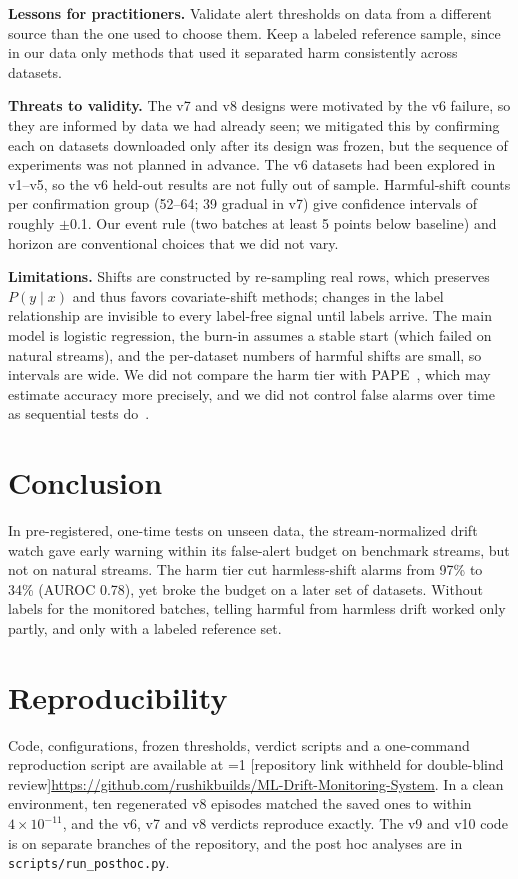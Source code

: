 \documentclass[conference]{IEEEtran}
\providecommand{\anonymous}{1}
\newcommand{\coderef}{\ifnum\anonymous=1 [repository link withheld for double-blind review]\else \url{https://github.com/rushikbuilds/ML-Drift-Monitoring-System}\fi}
\begin{document}
\textbf{Lessons for practitioners.} Validate alert thresholds on data from a different source than the one used to choose them. Keep a labeled reference sample, since in our data only methods that used it separated harm consistently across datasets.

\textbf{Threats to validity.} The v7 and v8 designs were motivated by the v6 failure, so they are informed by data we had already seen; we mitigated this by confirming each on datasets downloaded only after its design was frozen, but the sequence of experiments was not planned in advance. The v6 datasets had been explored in v1--v5, so the v6 held-out results are not fully out of sample. Harmful-shift counts per confirmation group (52--64; 39 gradual in v7) give confidence intervals of roughly $\pm$0.1. Our event rule (two batches at least 5 points below baseline) and horizon are conventional choices that we did not vary.

\textbf{Limitations.} Shifts are constructed by re-sampling real rows, which preserves $P(y \mid x)$ and thus favors covariate-shift methods; changes in the label relationship are invisible to every label-free signal until labels arrive. The main model is logistic regression, the burn-in assumes a stable start (which failed on natural streams), and the per-dataset numbers of harmful shifts are small, so intervals are wide. We did not compare the harm tier with PAPE~\cite{bialek2025pape}, which may estimate accuracy more precisely, and we did not control false alarms over time as sequential tests do~\cite{podkopaev2022tracking}.

\section{Conclusion}
In pre-registered, one-time tests on unseen data, the stream-normalized drift watch gave early warning within its false-alert budget on benchmark streams, but not on natural streams. The harm tier cut harmless-shift alarms from 97\% to 34\% (AUROC 0.78), yet broke the budget on a later set of datasets. Without labels for the monitored batches, telling harmful from harmless drift worked only partly, and only with a labeled reference set.

\section*{Reproducibility}
Code, configurations, frozen thresholds, verdict scripts and a one-command reproduction script are available at \coderef. In a clean environment, ten regenerated v8 episodes matched the saved ones to within $4\times10^{-11}$, and the v6, v7 and v8 verdicts reproduce exactly. The v9 and v10 code is on separate branches of the repository, and the post hoc analyses are in \texttt{scripts/run\_posthoc.py}.
\end{document}
